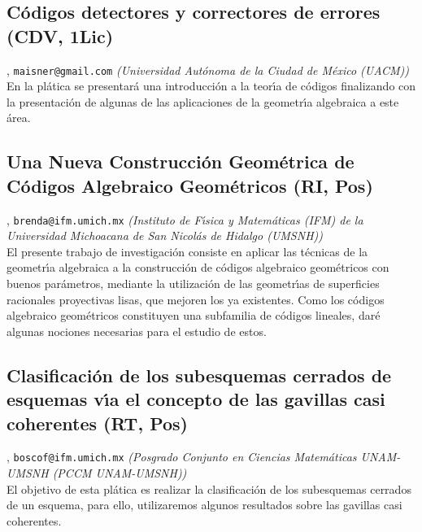 \subsection{\sffamily C\'odigos detectores y correctores de errores {\footnotesize (CDV, 1Lic)}} \label{reg-1500} 
, {\tt maisner@gmail.com}  {\slshape (Universidad Aut\'onoma de la Ciudad de M\'exico (UACM))}\\
          \noindent En la pl\'atica se presentar\'a una introducci\'on a la teor\'\i a de c\'odigos finalizando con la presentaci\'on de algunas de las aplicaciones de la geometr\'\i a algebraica a este \'area.
\subsection{\sffamily Una Nueva Construcci\'on Geom\'etrica de C\'odigos Algebraico Geom\'etricos {\footnotesize (RI, Pos)}} \label{reg-581} 
, {\tt brenda@ifm.umich.mx}  {\slshape (Instituto de F\'\i sica y Matem\'aticas (IFM) de la Universidad Michoacana de San Nicol\'as de Hidalgo (UMSNH))}\\
          \noindent El presente trabajo de investigaci\'on consiste en aplicar las t\'ecnicas de la geometr\'\i a algebraica a la construcci\'on de c\'odigos algebraico geom\'etricos con buenos par\'ametros, mediante la utilizaci\'on de las geometr\'\i as de superficies racionales proyectivas lisas, que mejoren los ya existentes. Como los c\'odigos algebraico geom\'etricos constituyen una subfamilia de c\'odigos lineales, dar\'e algunas nociones necesarias para el estudio de estos.
\subsection{\sffamily Clasificaci\'on de los subesquemas cerrados de esquemas v\'\i a el concepto de las gavillas casi coherentes {\footnotesize (RT, Pos)}} \label{reg-910} 
, {\tt boscof@ifm.umich.mx}  {\slshape (Posgrado Conjunto en Ciencias Matem\'aticas UNAM-UMSNH (PCCM UNAM-UMSNH))}\\
          \noindent El objetivo de esta pl\'atica es realizar la clasificaci\'on de los subesquemas cerrados de un esquema, para ello, utilizaremos algunos resultados sobre las gavillas casi coherentes.
